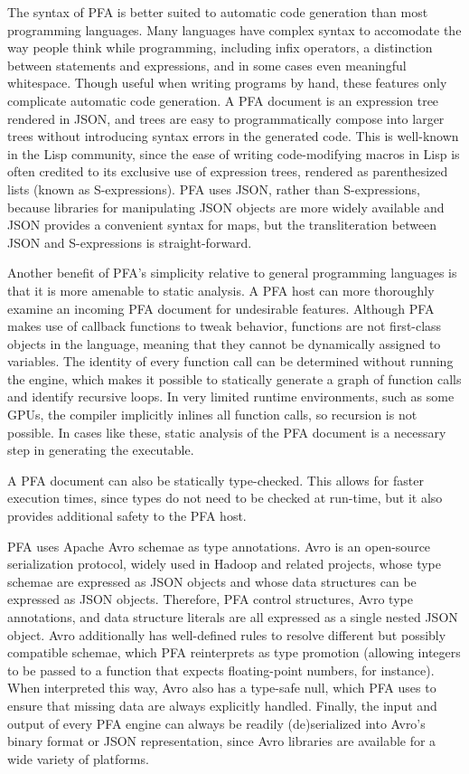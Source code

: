 \documentclass{article}
\begin{document}
The syntax of PFA is better suited to automatic code generation than most programming languages.  Many languages have complex syntax to accomodate the way people think while programming, including infix operators, a distinction between statements and expressions, and in some cases even meaningful whitespace.  Though useful when writing programs by hand, these features only complicate automatic code generation.  A PFA document is an expression tree rendered in JSON, and trees are easy to programmatically compose into larger trees without introducing syntax errors in the generated code.  This is well-known in the Lisp community, since the ease of writing code-modifying macros in Lisp is often credited to its exclusive use of expression trees, rendered as parenthesized lists (known as S-expressions).  PFA uses JSON, rather than S-expressions, because libraries for manipulating JSON objects are more widely available and JSON provides a convenient syntax for maps, but the transliteration between JSON and S-expressions is straight-forward.

Another benefit of PFA's simplicity relative to general programming languages is that it is more amenable to static analysis.  A PFA host can more thoroughly examine an incoming PFA document for undesirable features.  Although PFA makes use of callback functions to tweak behavior, functions are not first-class objects in the language, meaning that they cannot be dynamically assigned to variables.  The identity of every function call can be determined without running the engine, which makes it possible to statically generate a graph of function calls and identify recursive loops.  In very limited runtime environments, such as some GPUs, the compiler implicitly inlines all function calls, so recursion is not possible.  In cases like these, static analysis of the PFA document is a necessary step in generating the executable.

A PFA document can also be statically type-checked.  This allows for faster execution times, since types do not need to be checked at run-time, but it also provides additional safety to the PFA host.

PFA uses Apache Avro schemae as type annotations.  Avro is an open-source serialization protocol, widely used in Hadoop and related projects, whose type schemae are expressed as JSON objects and whose data structures can be expressed as JSON objects.  Therefore, PFA control structures, Avro type annotations, and data structure literals are all expressed as a single nested JSON object.  Avro additionally has well-defined rules to resolve different but possibly compatible schemae, which PFA reinterprets as type promotion (allowing integers to be passed to a function that expects floating-point numbers, for instance).  When interpreted this way, Avro also has a type-safe null, which PFA uses to ensure that missing data are always explicitly handled.  Finally, the input and output of every PFA engine can always be readily (de)serialized into Avro's binary format or JSON representation, since Avro libraries are available for a wide variety of platforms.
\end{document}
